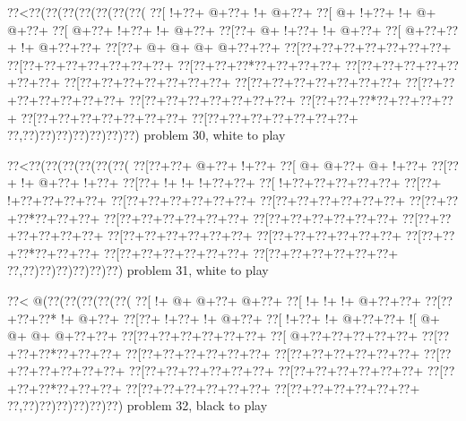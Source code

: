 \vbox{\vbox{\goo
\0??<\0??(\0??(\0??(\0??(\0??(\0??(\0??(
\0??[\- !+\0??+\- @+\0??+\- !+\- @+\0??+
\0??[\- @+\- !+\0??+\- !+\- @+\- @+\0??+
\0??[\- @+\0??+\- !+\0??+\- !+\- @+\0??+
\0??[\0??+\- @+\- !+\0??+\- !+\- @+\0??+
\0??[\- @+\0??+\0??+\- !+\- @+\0??+\0??+
\0??[\0??+\- @+\- @+\- @+\- @+\0??+\0??+
\0??[\0??+\0??+\0??+\0??+\0??+\0??+\0??+
\0??[\0??+\0??+\0??+\0??+\0??+\0??+\0??+
\0??[\0??+\0??+\0??*\0??+\0??+\0??+\0??+
\0??[\0??+\0??+\0??+\0??+\0??+\0??+\0??+
\0??[\0??+\0??+\0??+\0??+\0??+\0??+\0??+
\0??[\0??+\0??+\0??+\0??+\0??+\0??+\0??+
\0??[\0??+\0??+\0??+\0??+\0??+\0??+\0??+
\0??[\0??+\0??+\0??+\0??+\0??+\0??+\0??+
\0??[\0??+\0??+\0??*\0??+\0??+\0??+\0??+
\0??[\0??+\0??+\0??+\0??+\0??+\0??+\0??+
\0??[\0??+\0??+\0??+\0??+\0??+\0??+\0??+
\0??,\0??)\0??)\0??)\0??)\0??)\0??)\0??)
}
\hfil problem 30, white to play\hfil\break
}

\vbox{\vbox{\goo
\0??<\0??(\0??(\0??(\0??(\0??(\0??(
\0??[\0??+\0??+\- @+\0??+\- !+\0??+
\0??[\- @+\- @+\0??+\- @+\- !+\0??+
\0??[\0??+\- !+\- @+\0??+\- !+\0??+
\0??[\0??+\- !+\- !+\- !+\0??+\0??+
\0??[\- !+\0??+\0??+\0??+\0??+\0??+
\0??[\0??+\- !+\0??+\0??+\0??+\0??+
\0??[\0??+\0??+\0??+\0??+\0??+\0??+
\0??[\0??+\0??+\0??+\0??+\0??+\0??+
\0??[\0??+\0??+\0??*\0??+\0??+\0??+
\0??[\0??+\0??+\0??+\0??+\0??+\0??+
\0??[\0??+\0??+\0??+\0??+\0??+\0??+
\0??[\0??+\0??+\0??+\0??+\0??+\0??+
\0??[\0??+\0??+\0??+\0??+\0??+\0??+
\0??[\0??+\0??+\0??+\0??+\0??+\0??+
\0??[\0??+\0??+\0??*\0??+\0??+\0??+
\0??[\0??+\0??+\0??+\0??+\0??+\0??+
\0??[\0??+\0??+\0??+\0??+\0??+\0??+
\0??,\0??)\0??)\0??)\0??)\0??)\0??)
}
\hfil problem 31, white to play\hfil\break
}

\vbox{\vbox{\goo
\0??<\- @(\0??(\0??(\0??(\0??(\0??(
\0??[\- !+\- @+\- @+\0??+\- @+\0??+
\0??[\- !+\- !+\- !+\- @+\0??+\0??+
\0??[\0??+\0??+\0??*\- !+\- @+\0??+
\0??[\0??+\- !+\0??+\- !+\- @+\0??+
\0??[\- !+\0??+\- !+\- @+\0??+\0??+
\- ![\- @+\- @+\- @+\- @+\0??+\0??+
\0??[\0??+\0??+\0??+\0??+\0??+\0??+
\0??[\- @+\0??+\0??+\0??+\0??+\0??+
\0??[\0??+\0??+\0??*\0??+\0??+\0??+
\0??[\0??+\0??+\0??+\0??+\0??+\0??+
\0??[\0??+\0??+\0??+\0??+\0??+\0??+
\0??[\0??+\0??+\0??+\0??+\0??+\0??+
\0??[\0??+\0??+\0??+\0??+\0??+\0??+
\0??[\0??+\0??+\0??+\0??+\0??+\0??+
\0??[\0??+\0??+\0??*\0??+\0??+\0??+
\0??[\0??+\0??+\0??+\0??+\0??+\0??+
\0??[\0??+\0??+\0??+\0??+\0??+\0??+
\0??,\0??)\0??)\0??)\0??)\0??)\0??)
}
\hfil problem 32, black to play\hfil\break
}

